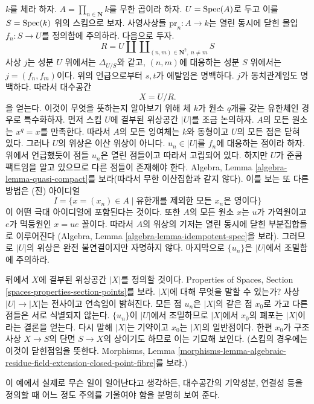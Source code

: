 \begin{example}
\label{example-infinite-product}
$k$를 체라 하자.
$A = \prod_{n \in \mathbf{N}} k$를 무한 곱이라 하자.
$U = \mathop{\mathrm{Spec}}(A)$로 두고 이를 $S = \mathop{\mathrm{Spec}}(k)$ 위의 스킴으로 보자.
사영사상들 $\text{pr}_n : A \to k$는 열린 동시에 닫힌 몰입
$f_n : S \to U$를 정의함에 주의하라. 다음으로 두자.
$$
R = U \amalg \coprod\nolimits_{(n, m) \in \mathbf{N}^2, \ n \not = m} S
$$
사상 $j$는 성분 $U$ 위에서는 $\Delta_{U/S}$와 같고,
$(n, m)$에 대응하는 성분 $S$ 위에서는 $j = (f_n, f_m)$이다.
위의 언급으로부터 $s, t$가 에탈임은 명백하다.
$j$가 동치관계임도 명백하다. 따라서 대수공간
$$
X = U/R.
$$
을 얻는다. 이것이 무엇을 뜻하는지 알아보기 위해 체 $k$가 원소
$q$개를 갖는 유한체인 경우로 특수화하자. 먼저 스킴 $U$에 결부된
위상공간 $|U|$를 조금 논의하자. $A$의 모든 원소는 $x^q = x$를
만족한다. 따라서 $A$의 모든 잉여체는 $k$와 동형이고 $U$의 모든
점은 닫혀 있다. 그러나 $U$의 위상은 이산 위상이 아니다.
$u_n \in |U|$를 $f_n$에 대응하는 점이라 하자. 위에서 언급했듯이
점들 $u_n$은 열린 점들이고 따라서 고립되어 있다. 하지만 $U$가
준콤팩트임을 알고 있으므로 다른 점들이 존재해야 한다. Algebra, Lemma
\ref{algebra-lemma-quasi-compact}를 보라(따라서 무한 이산집합과 같지
않다). 이를 보는 또 다른 방법은 (진) 아이디얼
$$
I =
\{x = (x_n) \in A \mid \text{유한개를 제외한 모든 }x_n\text{은 영이다}\}
$$
이 어떤 극대 아이디얼에 포함된다는 것이다. 또한 $A$의 모든 원소
$x$는 $u$가 가역원이고 $e$가 멱등원인 $x = ue$ 꼴이다.
따라서 $A$의 위상의 기저는 열린 동시에 닫힌 부분집합들로 이루어진다
(Algebra, Lemma \ref{algebra-lemma-idempotent-spec}을 보라).
그러므로 $|U|$의 위상은 완전 불연결이지만 자명하지 않다.
마지막으로 $\{u_n\}$은 $|U|$에서 조밀함에 주의하라.

\medskip\noindent
뒤에서 $X$에 결부된 위상공간 $|X|$를 정의할 것이다. Properties of
Spaces, Section \ref{spaces-properties-section-points}를 보라.
$|X|$에 대해 무엇을 말할 수 있는가?
사상 $|U| \to |X|$는 전사이고 연속임이 밝혀진다.
모든 점 $u_n$은 $|X|$의 같은 점 $x_0$로 가고 다른 점들은 서로
식별되지 않는다. $\{u_n\}$이 $|U|$에서 조밀하므로 $|X|$에서
$x_0$의 폐포는 $|X|$이라는 결론을 얻는다. 다시 말해 $|X|$는
기약이고 $x_0$는 $|X|$의 일반점이다. 한편 $x_0$가 구조사상
$X \to S$의 단면 $S \to X$의 상이기도 하므로 이는 기묘해 보인다.
(스킴의 경우에는 이것이 닫힌점임을 뜻한다. Morphisms, Lemma
\ref{morphisms-lemma-algebraic-residue-field-extension-closed-point-fibre}를
보라.)
\end{example}

\noindent
이 예에서 실제로 무슨 일이 일어난다고 생각하든, 대수공간의 기약성분,
연결성 등을 정의할 때 어느 정도 주의를 기울여야 함을 분명히 보여 준다.

